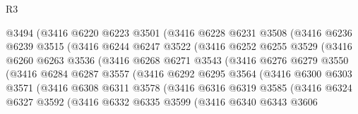 \begin{lexlean}{R3}
\begin{coremodule}
                  @3494
                  (@3416
                    @6220
                    @6223
                    @3501
                    (@3416
                      @6228
                      @6231
                      @3508
                      (@3416
                        @6236
                        @6239
                        @3515
                        (@3416
                          @6244
                          @6247
                          @3522
                          (@3416
                            @6252
                            @6255
                            @3529
                            (@3416
                              @6260
                              @6263
                              @3536
                              (@3416
                                @6268
                                @6271
                                @3543
                                (@3416
                                  @6276
                                  @6279
                                  @3550
                                  (@3416
                                    @6284
                                    @6287
                                    @3557
                                    (@3416
                                      @6292
                                      @6295
                                      @3564
                                      (@3416
                                        @6300
                                        @6303
                                        @3571
                                        (@3416
                                          @6308
                                          @6311
                                          @3578
                                          (@3416
                                            @6316
                                            @6319
                                            @3585
                                            (@3416
                                              @6324
                                              @6327
                                              @3592
                                              (@3416
                                                @6332
                                                @6335
                                                @3599
                                                (@3416
                                                  @6340
                                                  @6343
                                                  @3606

\end{coremodule}
\end{lexlean}
